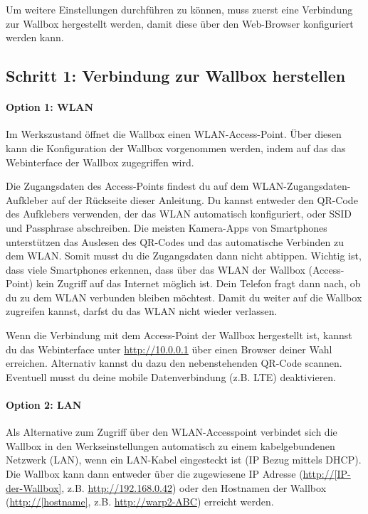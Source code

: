 \documentclass[a4paper,10pt]{article}
\begin{document}
\begin{multicols*}{2}
	Um weitere Einstellungen durchführen zu können, muss zuerst eine Verbindung
	zur Wallbox hergestellt werden, damit diese über den Web-Browser
	konfiguriert werden kann.

	\subsection{Schritt 1: Verbindung zur Wallbox herstellen}

	\paragraph{Option 1: WLAN}
	Im Werkszustand öffnet die Wallbox einen WLAN-Access-Point. Über diesen kann
	die Konfiguration der Wallbox vorgenommen werden, indem auf das
	das Webinterface der Wallbox zugegriffen wird.

	Die Zugangsdaten des Access-Points findest du auf dem WLAN-Zugangsdaten-Aufkleber
	auf der Rückseite dieser Anleitung. Du kannst entweder den QR-Code des Aufklebers verwenden,
	der das WLAN automatisch konfiguriert, oder SSID und Passphrase abschreiben.
	Die meisten Kamera-Apps von Smartphones unterstützen das Auslesen des
	QR-Codes und das automatische Verbinden zu dem WLAN. Somit musst du die
	Zugangsdaten dann nicht abtippen. Wichtig ist, dass viele Smartphones
	erkennen, dass über das WLAN der Wallbox (Access-Point) kein Zugriff auf das
	Internet möglich ist. Dein Telefon fragt dann nach, ob du zu dem WLAN
	verbunden bleiben möchtest. Damit du weiter auf die Wallbox zugreifen
	kannst, darfst du das WLAN nicht wieder verlassen.

	\begin{minipage}{0.35\textwidth}
		Wenn die Verbindung mit dem Access-Point der Wallbox hergestellt ist, kannst du das Webinterface
		unter \url{http://10.0.0.1} über einen Browser deiner Wahl erreichen.
		Alternativ kannst du dazu den nebenstehenden QR-Code scannen.
		Eventuell musst du deine mobile Datenverbindung (z.B. LTE) deaktivieren.
	\end{minipage}\hfill
	\begin{minipage}{0.12\textwidth}
		\begin{flushright}
		\end{flushright}
	\end{minipage}

	\paragraph{Option 2: LAN}
	Als Alternative zum Zugriff über den WLAN-Accesspoint verbindet sich die
	Wallbox in den Werkseinstellungen automatisch zu einem
	kabelgebundenen Netzwerk (LAN), wenn ein LAN-Kabel eingesteckt ist (IP Bezug
	mittels DHCP). Die Wallbox kann dann entweder über die zugewiesene IP
	Adresse (\url{http://[IP-der-Wallbox]}, z.B. \url{http://192.168.0.42})
	oder den Hostnamen der Wallbox (\url{http://[hostname]}, z.B.
	\url{http://warp2-ABC}) erreicht werden.


\end{multicols*}
\end{document}
